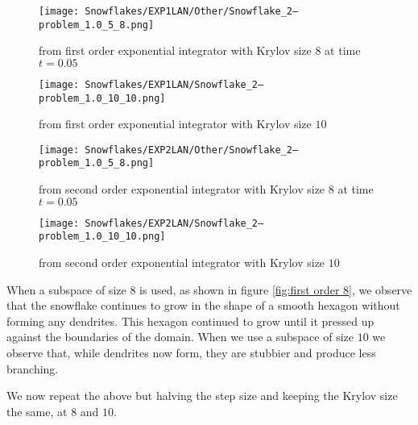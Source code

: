 \begin{figure}[H]
    \centering
    \begin{minipage}{0.49\textwidth}
        \texttt{[image: Snowflakes/EXP1LAN/Other/Snowflake\_2--problem\_1.0\_5\_8.png]} %
        \caption{from first order exponential integrator with Krylov size $8$ at time $t=0.05$}
        \label{fig:first order 8}
    \end{minipage}\hfill
    \centering
    \begin{minipage}{0.49\textwidth}
        \texttt{[image: Snowflakes/EXP1LAN/Snowflake\_2--problem\_1.0\_10\_10.png]} %
        \caption{from first order exponential integrator with Krylov size $10$}
        \label{fig:first order 10}
    \end{minipage}\hfill
\end{figure}
\begin{figure}[H]
    \centering
    \begin{minipage}{0.49\textwidth}
        \texttt{[image: Snowflakes/EXP2LAN/Other/Snowflake\_2--problem\_1.0\_5\_8.png]} %
        \caption{from second order exponential integrator with Krylov size $8$ at time $t=0.05$}
        \label{fig:second order 8}
    \end{minipage}\hfill
    \centering
    \begin{minipage}{0.49\textwidth}
        \texttt{[image: Snowflakes/EXP2LAN/Snowflake\_2--problem\_1.0\_10\_10.png]} %
        \caption{from second order exponential integrator with Krylov size $10$}
        \label{fig:second order 10}
    \end{minipage}\hfill
\end{figure}

When a subspace of size $8$ is used, as shown in figure \ref{fig:first order 8},
we observe that the snowflake continues to grow in the shape of a smooth hexagon without forming any dendrites.
This hexagon continued to grow until it pressed up against the boundaries of the domain.
When we use a subspace of size $10$ we observe that, while dendrites now form, they are stubbier and produce less branching.

We now repeat the above but halving the step size and keeping the Krylov size the same, at $8$ and $10$.


